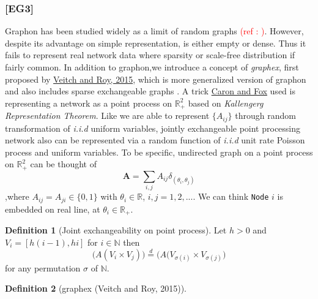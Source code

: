 \documentclass[12pt]{article}
\theoremstyle{definition}
\newtheorem{definition}{Definition}[section]
\begin{document}
\subsubsection{[EG3]}

Graphon has been studied widely as a limit of random graphs \textcolor{red}{(ref : )}. However, despite its advantage on simple representation, is either empty or dense. Thus it fails to represent real network data where sparsity or scale-free distribution if fairly common. In addition to graphon,we introduce a concept of \textit{graphex}, first proposed by \href{http://arxiv.org/abs/1512.03099}{Veitch and Roy, 2015}\cite{Veitch}, which is more generalized version of graphon and also includes sparse exchangeable graphs \cite{Caron}. A trick \hyperlink{Caron}{Caron and Fox} used is representing a network as a point process on $\mathbb{R}^2_{+}$ based on \textit{Kallengerg Representation Theorem}\cite{Kallenberg}. Like we are able to represent $\{ A_{ij} \}$ through random transformation of \textit{i.i.d} uniform variables, jointly exchangeable point processing network also can be represented via a random function of \textit{i.i.d} unit rate Poisson process and uniform variables. 
	To be specific, undirected graph on a point process on $\mathbb{R}^2_{+}$ can be thought of 
\begin{equation}
\mathbf{A} = \sum\limits_{i,j} A_{ij} \delta_{( \theta_{i}, \theta_{j})} 
\end{equation}	
,where $A_{ij} = A_{ji} \in \{ 0 , 1  \}$ with $\theta_{i} \in \mathbb{R}$, $i,j = 1,2,...$. We can think \texttt{Node} $i$ is embedded on real line, at $\theta_{i} \in \mathbb{R}_{+}$. 	


\begin{definition}[Joint exchangeability on point process]
	\label{point}
Let $h > 0$ and  $V_{i} = [h(i-1), hi ]$ for $i \in \mathbb{N}$ then
\begin{equation}
\big( A( V_{i} \times V_{j}  )   \big)  \stackrel{d}{=} \big( A( V_{\sigma(i)} \times V_{\sigma(j)}     \big)
\end{equation}	
for any permutation $\sigma$ of $\mathbb{N}$.		
\end{definition}








\begin{definition}[graphex (Veitch and Roy, 2015)]
	\label{graphex}
	
	

	
\end{definition}
\end{document}
